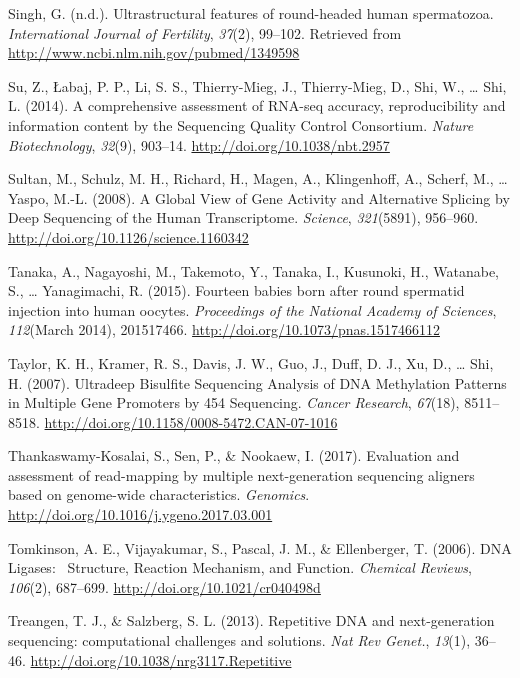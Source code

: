 \documentclass[12pt,twoside]{reedthesis}
\theoremstyle{definition}
\theoremstyle{definition}
\theoremstyle{remark}
\begin{document}
  \hypertarget{ref-Singh}{}
  Singh, G. (n.d.). Ultrastructural features of round-headed human
  spermatozoa. \emph{International Journal of Fertility}, \emph{37}(2),
  99--102. Retrieved from \url{http://www.ncbi.nlm.nih.gov/pubmed/1349598}
  
  \hypertarget{ref-Su2014}{}
  Su, Z., Łabaj, P. P., Li, S. S., Thierry-Mieg, J., Thierry-Mieg, D.,
  Shi, W., \ldots{} Shi, L. (2014). A comprehensive assessment of RNA-seq
  accuracy, reproducibility and information content by the Sequencing
  Quality Control Consortium. \emph{Nature Biotechnology}, \emph{32}(9),
  903--14. \url{http://doi.org/10.1038/nbt.2957}
  
  \hypertarget{ref-Sultan2008}{}
  Sultan, M., Schulz, M. H., Richard, H., Magen, A., Klingenhoff, A.,
  Scherf, M., \ldots{} Yaspo, M.-L. (2008). A Global View of Gene Activity
  and Alternative Splicing by Deep Sequencing of the Human Transcriptome.
  \emph{Science}, \emph{321}(5891), 956--960.
  \url{http://doi.org/10.1126/science.1160342}
  
  \hypertarget{ref-Tanaka2015}{}
  Tanaka, A., Nagayoshi, M., Takemoto, Y., Tanaka, I., Kusunoki, H.,
  Watanabe, S., \ldots{} Yanagimachi, R. (2015). Fourteen babies born
  after round spermatid injection into human oocytes. \emph{Proceedings of
  the National Academy of Sciences}, \emph{112}(March 2014), 201517466.
  \url{http://doi.org/10.1073/pnas.1517466112}
  
  \hypertarget{ref-Taylor2007}{}
  Taylor, K. H., Kramer, R. S., Davis, J. W., Guo, J., Duff, D. J., Xu,
  D., \ldots{} Shi, H. (2007). Ultradeep Bisulfite Sequencing Analysis of
  DNA Methylation Patterns in Multiple Gene Promoters by 454 Sequencing.
  \emph{Cancer Research}, \emph{67}(18), 8511--8518.
  \url{http://doi.org/10.1158/0008-5472.CAN-07-1016}
  
  \hypertarget{ref-Thankaswamy-Kosalai2017}{}
  Thankaswamy-Kosalai, S., Sen, P., \& Nookaew, I. (2017). Evaluation and
  assessment of read-mapping by multiple next-generation sequencing
  aligners based on genome-wide characteristics. \emph{Genomics}.
  \url{http://doi.org/10.1016/j.ygeno.2017.03.001}
  
  \hypertarget{ref-Tomkinson2006}{}
  Tomkinson, A. E., Vijayakumar, S., Pascal, J. M., \& Ellenberger, T.
  (2006). DNA Ligases:~ Structure, Reaction Mechanism, and Function.
  \emph{Chemical Reviews}, \emph{106}(2), 687--699.
  \url{http://doi.org/10.1021/cr040498d}
  
  \hypertarget{ref-Treangen2013}{}
  Treangen, T. J., \& Salzberg, S. L. (2013). Repetitive DNA and
  next-generation sequencing: computational challenges and solutions.
  \emph{Nat Rev Genet.}, \emph{13}(1), 36--46.
  \url{http://doi.org/10.1038/nrg3117.Repetitive}
  
\end{document}
